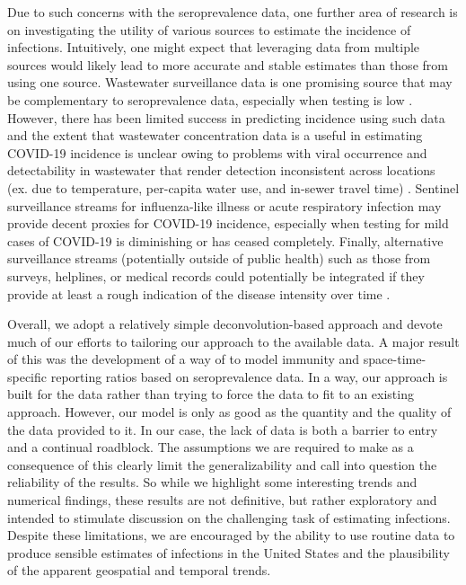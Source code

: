 \documentclass{article}
\begin{document}
Due to such concerns with the seroprevalence data, one further area of research
is on investigating the utility of various sources to estimate the incidence of
infections. Intuitively, one might expect that leveraging data from multiple
sources would likely lead to more accurate and stable estimates than those from
using one source. Wastewater surveillance data is one
promising source that may be complementary to seroprevalence data, especially
when testing is low \citep{mcmanus2023predicting}. However, there has been
limited success in predicting incidence using such data and the extent that
wastewater concentration data is a useful in estimating COVID-19 incidence is
unclear owing to problems with viral occurrence and detectability in wastewater
that render detection inconsistent across locations (ex. due to temperature,
per-capita water use, and in-sewer travel time) \citep{mcmanus2023predicting,
hart2020computational, li2023correlation}. Sentinel surveillance streams for
influenza-like illness or acute respiratory infection may provide decent proxies
for COVID-19 incidence, especially when testing for mild cases of COVID-19 is
diminishing or has ceased completely. Finally, alternative surveillance streams
(potentially outside of public health) such as those from surveys, helplines, or
medical records could potentially be integrated if they provide at least a rough
indication of the disease intensity over time \citep{ecdc2020strategies}.

Overall, we adopt a relatively simple deconvolution-based approach and devote
much of our efforts to tailoring our approach to the available data. A
major result of this was the development of a way of to model immunity and
space-time-specific reporting ratios based on seroprevalence data.
In a way, our approach is built for the data rather than trying to force the data to fit
to an existing approach. However, our model is only as good as the quantity and 
the quality of the data provided to it. In our case, the lack of data is both a barrier to entry
and a continual roadblock. The assumptions we are required to make as a
consequence of this clearly limit the generalizability and call into question
the reliability of the results. So while we highlight some interesting trends and
numerical findings, these results are not definitive, but rather exploratory and
intended to stimulate discussion on the challenging task of estimating
infections. Despite these limitations, we are encouraged by the ability to use
routine data to produce sensible estimates of infections in the United States and the
plausibility of the apparent geospatial and temporal trends. 
 
\end{document}
